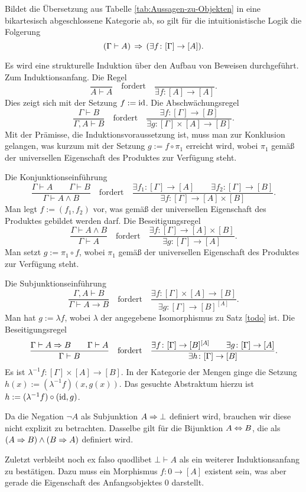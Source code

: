 \begin{Satz}\label{Urteil-impliziert-Morphismus}
Bildet die Übersetzung aus Tabelle \ref{tab:Aussagen-zu-Objekten} in
eine bikartesisch abgeschlossene Kategorie ab, so gilt für die
intuitionistische Logik die Folgerung
\[(\Gamma\vdash A) \,\Rightarrow\, (\exists f\colon [\Gamma]\to [A]).\]
\end{Satz}
\begin{Beweis}
Es wird eine strukturelle Induktion über den Aufbau von Beweisen
durchgeführt. Zum Induktionsanfang. Die Regel
\[\dfrac{}{A\vdash A}\quad\text{fordert}\quad\dfrac{}{\exists f\colon [A]\to [A]}.\]
Dies zeigt sich mit der Setzung $f:=\operatorname{id}$. Die Abschwächungsregel
\[\dfrac{\Gamma\vdash B}{\Gamma,A\vdash B}\quad\text{fordert}\quad
\dfrac{\exists f\colon [\Gamma]\to [B]}{\exists g\colon [\Gamma]\times [A]\to [B]}.\]
Mit der Prämisse, die Induktionsvoraussetzung ist, muss man zur
Konklusion gelangen, was kurzum mit der Setzung $g:=f\circ\pi_1$
erreicht wird, wobei $\pi_1$ gemäß der universellen Eigenschaft des
Produktes zur Verfügung steht.

Die Konjunktionseinführung
\[\dfrac{\Gamma\vdash A\qquad\Gamma\vdash B}{\Gamma\vdash A\land B}
\quad\text{fordert}\quad
\dfrac{\exists f_1\colon [\Gamma]\to [A]\qquad\exists f_2\colon [\Gamma]\to [B]}
{\exists f\colon [\Gamma]\to [A]\times [B]}.\]
Man legt $f:=(f_1, f_2)$ vor, was gemäß der universellen
Eigenschaft des Produktes gebildet werden darf. Die Beseitigungsregel
\[\dfrac{\Gamma\vdash A\land B}{\Gamma\vdash A}\quad\text{fordert}\quad
\dfrac{\exists f\colon [\Gamma]\to [A]\times [B]}
{\exists g\colon [\Gamma]\to [A]}.\]
Man setzt $g:=\pi_1\circ f$, wobei $\pi_1$ gemäß der universellen
Eigenschaft des Produktes zur Verfügung steht.

Die Subjunktionseinführung
\[\dfrac{\Gamma,A\vdash B}{\Gamma\vdash A\to B}\quad\text{fordert}\quad
\dfrac{\exists f\colon [\Gamma]\times [A]\to [B]}{\exists g\colon [\Gamma]\to [B]^{[A]}}.\]
Man hat $g:=\lambda f$, wobei $\lambda$ der angegebene Isomorphismus zu
Satz \ref{todo} ist. Die Beseitigungsregel
\[\dfrac{\Gamma\vdash A\Rightarrow B\qquad\Gamma\vdash A}{\Gamma\vdash B}\quad\text{fordert}\quad
\dfrac{\exists f\colon [\Gamma]\to [B]^{[A]}\qquad\exists g\colon [\Gamma]\to [A]}
{\exists h\colon [\Gamma]\to [B]}.\]
Es ist $\lambda^{-1} f\colon [\Gamma]\times [A]\to [B]$. In der Kategorie
der Mengen ginge die Setzung $h(x) := (\lambda^{-1} f)(x, g(x))$. Das
gesuchte Abstraktum hierzu ist $h := (\lambda^{-1} f)\circ (\operatorname{id}, g)$.

Da die Negation $\lnot A$ als Subjunktion $A\Rightarrow\bot$ definiert wird,
brauchen wir diese nicht explizit zu betrachten. Dasselbe gilt für
die Bijunktion $A\Leftrightarrow B$, die als $(A\Rightarrow B)\land (B\Rightarrow A)$
definiert wird.

Zuletzt verbleibt noch ex falso quodlibet $\bot\vdash A$ als
ein weiterer Induktionsanfang zu bestätigen. Dazu muss ein Morphismus
$f\colon 0\to [A]$ existent sein, was aber gerade die Eigenschaft des
Anfangsobjektes $0$ darstellt.\,\qedsymbol
\end{Beweis}

